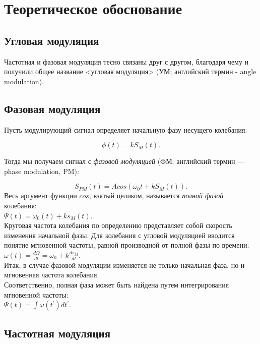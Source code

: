 \documentclass[a4paper,14pt]{article}
\begin{document}
\section{Теоретическое обоснование}

\subsection{Угловая модуляция}
Частотная и фазовая модуляция тесно связаны друг с другом, благодаря чему и получили общее название <угловая модуляция> (УМ; английский термин - angle modulation).\\

\subsection{Фазовая модуляция}
Пусть модулирующий сигнал определяет начальную фазу несущего колебания:

\[
	\phi(t) = kS_M(t).
\]

Тогда мы получаем сигнал с \textit{фазовой модуляцией} (ФМ; английский термин — phase modulation, PM):

\[
	S_{PM} (t)=A cos(\omega_0t + kS_M(t)).
\]
Весь аргумент функции $cos$, взятый целиком, называется \textit{полной фазой} колебания:\\

$\Psi (t)=\omega _{0}(t)+ks_{M}(t)$.\\

Круговая частота колебания по определению представляет собой скорость изменения начальной фазы. Для колебания с угловой модуляцией вводится понятие мгновенной частоты, равной производной от полной фазы по времени:\\

$\omega (t)=\frac{d\Omega}{dt}=\omega _{0}+k\frac{ds_{M}}{dt}$.\\

Итак, в случае фазовой модуляции изменяется не только начальная фаза, но и мгновенная частота колебания.\\

Соответственно, полная фаза может быть найдена путем интегрирования мгновенной частоты:\\

$\Psi (t)=\int \omega \left({t}^{\prime }\right)d{t}^{\prime }$.\\

\subsection{Частотная модуляция}
\end{document}
